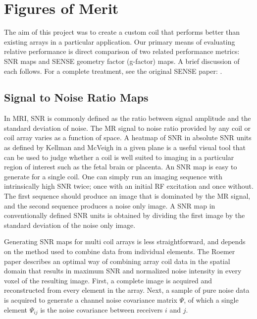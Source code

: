 \chapter{Figures of Merit}
The aim of this project was to create a custom coil that performs better than existing arrays in a
particular application. Our primary means of evaluating relative performance is direct comparison of two related
performance metrics: SNR maps and SENSE geometry factor (g-factor) maps. A brief discussion of each follows. For a
complete treatment, see the original SENSE paper: \cite{Pruessmann1999}.

\section{Signal to Noise Ratio Maps}

In MRI, SNR is commonly defined as the ratio between signal amplitude and the standard deviation of noise. The MR signal
to noise ratio provided by any coil or coil array varies as a function of space. A heatmap of SNR in absolute SNR units
as defined by Kellman and McVeigh \cite{Kellman2005} in a given plane is a useful visual tool that can be used to judge
whether a coil is well suited to imaging in a particular region of interest such as the fetal brain or placenta. An SNR
map is easy to generate for a single coil. One can simply run an imaging sequence with intrinsically high SNR twice;
once with an initial RF excitation and once without. The first sequence should produce an image that is dominated by the
MR signal, and the second sequence produces a noise only image. A SNR map in conventionally defined SNR units is
obtained by dividing the first image by the standard deviation of the noise only image.

Generating SNR maps for multi coil arrays is less straightforward, and depends on the method used to combine data from
individual elements. The Roemer paper \cite{Roemer90} describes an optimal way of combining array coil data in the
spatial domain that results in maximum SNR and normalized noise intensity in every voxel of the resulting image.  First,
a complete image is acquired and reconstructed from every element in the array. Next, a sample of pure noise data is
acquired to generate a channel noise covariance matrix $\Psi$, of which a single element $\Psi_{ij}$ is the noise
covariance between receivers $i$ and $j$. 

